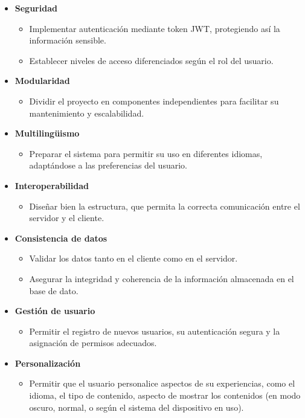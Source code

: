 \begin{itemize}
    \item \textbf{Seguridad}
    \begin{itemize}
        \item Implementar autenticación mediante token JWT, protegiendo así la información sensible.
        \item Establecer niveles de acceso diferenciados según el rol del usuario.
    \end{itemize}
    
    \item \textbf{Modularidad}
    \begin{itemize}
        \item Dividir el proyecto en componentes independientes para facilitar su mantenimiento y escalabilidad.
    \end{itemize}
    
    \item \textbf{Multilingüismo}
    \begin{itemize}
        \item Preparar el sistema para permitir su uso en diferentes idiomas, adaptándose a las preferencias del usuario.
    \end{itemize}
    
    \item \textbf{Interoperabilidad}
    \begin{itemize}
        \item Diseñar bien la estructura, que permita la correcta comunicación entre el servidor y el cliente.
    \end{itemize}
    
    \item \textbf{Consistencia de datos}
    \begin{itemize}
        \item Validar los datos tanto en el cliente como en el servidor.
        \item Asegurar la integridad y coherencia de la información almacenada en el base de dato.
    \end{itemize}
    
    \item \textbf{Gestión de usuario}
    \begin{itemize}
        \item Permitir el registro de nuevos usuarios, su autenticación segura y la asignación de permisos adecuados.
    \end{itemize}
    
    \item \textbf{Personalización}
    \begin{itemize}
        \item Permitir que el usuario personalice aspectos de su experiencias, como el idioma, el tipo de contenido, aspecto de mostrar los contenidos (en modo oscuro, normal, o según el sistema del dispositivo en uso).
    \end{itemize}
\end{itemize}